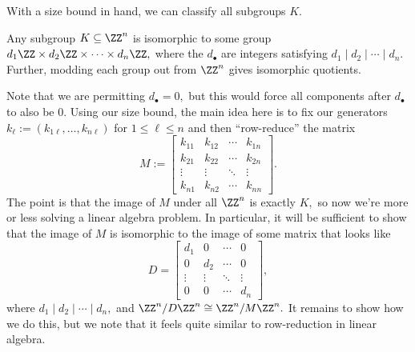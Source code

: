 With a size bound in hand, we can classify all subgroups $K.$
\begin{lemma}
    Any subgroup $K\subseteq\ZZ^n$ is isomorphic to some group $d_1\ZZ\times d_2\ZZ\times\cdots\times d_n\ZZ,$ where the $d_\bullet$ are integers satisfying $d_1\mid d_2\mid\cdots\mid d_n.$ Further, modding each group out from $\ZZ^n$ gives isomorphic quotients.
\end{lemma}
Note that we are permitting $d_\bullet=0,$ but this would force all components after $d_\bullet$ to also be $0.$ Using our size bound, the main idea here is to fix our generators $k_\ell:=(k_{1\ell},\ldots,k_{n\ell})$ for $1\le\ell\le n$ and then ``row-reduce'' the matrix
\[M:=\begin{bmatrix}
    k_{11} & k_{12} & \cdots & k_{1n} \\
    k_{21} & k_{22} & \cdots & k_{2n} \\
    \vdots & \vdots & \ddots & \vdots \\
    k_{n1} & k_{n2} & \cdots & k_{nn}
\end{bmatrix}.\]
The point is that the image of $M$ under all $\ZZ^n$ is exactly $K,$ so now we're more or less solving a linear algebra problem. In particular, it will be sufficient to show that the image of $M$ is isomorphic to the image of some matrix that looks like
\[D=\begin{bmatrix}
    d_1 & 0 & \cdots & 0 \\
    0 & d_2 & \cdots & 0 \\
    \vdots & \vdots & \ddots & \vdots \\
    0 & 0 & \cdots & d_n
\end{bmatrix},\]
where $d_1\mid d_2\mid\cdots\mid d_n,$ and $\ZZ^n/D\ZZ^n\cong\ZZ^n/M\ZZ^n.$ It remains to show how we do this, but we note that it feels quite similar to row-reduction in linear algebra.

